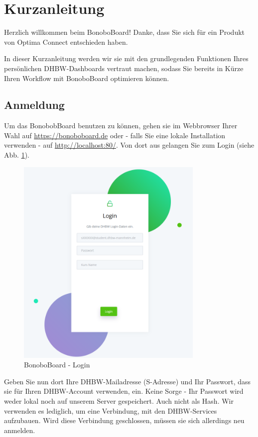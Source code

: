 \documentclass[a4paper,11pt]{scrartcl}
\begin{document}
\section{Kurzanleitung}\label{Kurzanleitung}
Herzlich willkommen beim BonoboBoard! Danke, dass Sie sich für ein Produkt von Optima Connect entschieden haben. 

\bigskip
In dieser Kurzanleitung werden wir sie mit den grundlegenden Funktionen Ihres persönlichen DHBW-Dashboards vertraut machen, sodass Sie bereits in Kürze Ihren Workflow mit BonoboBoard optimieren können.

\subsection{Anmeldung}
Um das BonobobBoard benutzen zu können, gehen sie im Webbrowser Ihrer Wahl auf \url{https://bonoboboard.de} oder - falls Sie eine lokale Installation verwenden - auf \url{http://localhost:80/}. Von dort aus gelangen Sie zum Login (siehe Abb. \ref{img:login}).

\begin{figure}[H]
	\begin{center}
		\includegraphics[width=0.8\textwidth]{login}
		\caption{BonoboBoard - Login}
		\label{img:login}
	\end{center}
\end{figure}
\noindent

Geben Sie nun dort Ihre DHBW-Mailadresse (\frqq{}S-Adresse\flqq{}) und Ihr Passwort, dass sie für Ihren DHBW-Account verwenden, ein. Keine Sorge - Ihr Passwort wird weder lokal noch auf unserem Server gespeichert. Auch nicht als Hash. Wir verwenden es lediglich, um eine Verbindung, mit den DHBW-Services aufzubauen. Wird diese Verbindung geschlossen, müssen sie sich allerdings neu anmelden.
\end{document}
